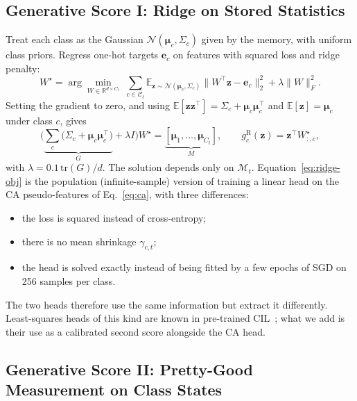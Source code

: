 \subsection{Generative Score I: Ridge on Stored Statistics}
Treat each class as the Gaussian $\mathcal N(\boldsymbol\mu_c,\Sigma_c)$ given by
the memory, with uniform class priors. Regress one-hot targets $\mathbf e_c$
on features with squared loss and ridge penalty:
\begin{equation}
  W^\star=\arg\min_{W\in\mathbb R^{d\times C_t}}\;
  \sum_{c\in\mathcal C_t}\mathbb E_{\mathbf z\sim\mathcal N(\boldsymbol\mu_c,\Sigma_c)}
  \big\|W^{\top}\mathbf z-\mathbf e_c\big\|_2^2+\lambda\|W\|_F^2 .
  \label{eq:ridge-obj}
\end{equation}
Setting the gradient to zero, and using $\mathbb E[\mathbf z\mathbf z^{\top}]=\Sigma_c+\boldsymbol\mu_c\boldsymbol\mu_c^{\top}$
and $\mathbb E[\mathbf z]=\boldsymbol\mu_c$ under class $c$, gives
\begin{equation}
  \Big(\underbrace{\textstyle\sum_{c}\big(\Sigma_c+\boldsymbol\mu_c\boldsymbol\mu_c^{\top}\big)}_{G}+\lambda I\Big)W^\star
  =\underbrace{[\boldsymbol\mu_1,\dots,\boldsymbol\mu_{C_t}]}_{M},
  \qquad
  g^{\mathrm{R}}_c(\mathbf z)=\mathbf z^{\top}W^\star_{:,c},
  \label{eq:ridge}
\end{equation}
with $\lambda=0.1\,\mathrm{tr}(G)/d$. The solution depends only on
$\mathcal M_t$. Equation~\eqref{eq:ridge-obj} is the population (infinite-sample)
version of training a linear head on the CA pseudo-features of
Eq.~\eqref{eq:ca}, with three differences:
\begin{itemize}
  \item the loss is squared instead of cross-entropy;
  \item there is no mean shrinkage $\gamma_{c,t}$;
  \item the head is solved exactly instead of being fitted by a few epochs of
    SGD on 256 samples per class.
\end{itemize}
The two heads therefore use the same information but extract it differently.
Least-squares heads of this kind are known in pre-trained
CIL~\cite{mcdonnell2023ranpac}; what we add is their use as a calibrated
second score alongside the CA head.

\subsection{Generative Score II: Pretty-Good Measurement on Class States}
